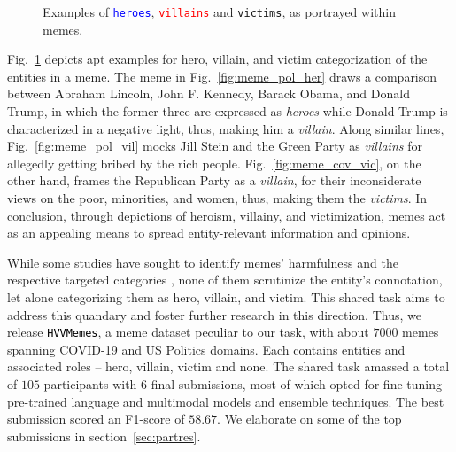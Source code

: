 \documentclass[11pt]{article}
\newcommand{\dataset}{\textcolor{black}{\texttt{HVVMemes}}}
\begin{document}
\begin{figure}[t!]
\caption{Examples of \texttt{\textcolor{blue}{heroes}}, \texttt{\textcolor{red}{villains}} and \texttt{\textcolor{deepgreen}{victims}}, as portrayed within memes.}
\label{fig:meme_hvv_eg}
\end{figure}



Fig.~\ref{fig:meme_hvv_eg} depicts apt examples for hero, villain, and victim categorization of the entities in a meme. The meme in Fig.~\ref{fig:meme_pol_her} draws a comparison between Abraham Lincoln, John F. Kennedy, Barack Obama, and Donald Trump, in which the former three are expressed as \emph{heroes} while Donald Trump is characterized in a negative light, thus, making him a \emph{villain}. Along similar lines, Fig.~\ref{fig:meme_pol_vil} mocks Jill Stein and the Green Party as \emph{villains} for allegedly getting bribed by the rich people. Fig.~\ref{fig:meme_cov_vic}, on the other hand, frames the Republican Party as a \emph{villain}, for their inconsiderate views on the poor, minorities, and women, thus, making them the \emph{victims}. In conclusion, through depictions of heroism, villainy, and victimization, memes act as an appealing means to spread entity-relevant information and opinions.

While some studies have sought to identify memes' harmfulness and the respective targeted categories \cite{pramanick-etal-2021-detecting,pramanick-etal-2021-momenta-multimodal}, none of them scrutinize the entity's connotation, let alone categorizing them as hero, villain, and victim. This shared task aims to address this quandary and foster further research in this direction. Thus, we release \dataset, a meme dataset peculiar to our task, with about $7000$ memes spanning COVID-19 and US Politics domains. Each contains entities and associated roles -- hero, villain, victim and none. The shared task amassed a total of $105$ participants with $6$ final submissions, most of which opted for fine-tuning pre-trained language and multimodal models and ensemble techniques. The best submission scored an F1-score of $58.67$. We elaborate on some of the top submissions in section~\ref{sec:partres}.
\end{document}
